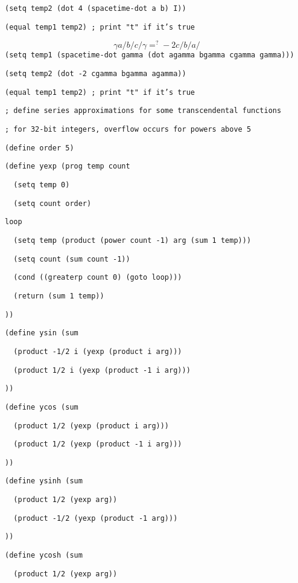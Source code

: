 {\tt (setq\ temp2\ (dot\ 4\ (spacetime-dot\ a\ b)\ I))}

{\tt (equal\ temp1\ temp2)\ ;\ print\ "t"\ if\ it's\ true}

$$\gamma a\!\!\!/b\!\!\!/c\!\!\!/\gamma\mathrel{\mathop=^?}
-2c\!\!\!/b\!\!\!/a\!\!\!/$$
{\tt (setq\ temp1\ (spacetime-dot\ gamma\ (dot\ agamma\ bgamma\ cgamma\ gamma)))}

{\tt (setq\ temp2\ (dot\ -2\ cgamma\ bgamma\ agamma))}

{\tt (equal\ temp1\ temp2)\ ;\ print\ "t"\ if\ it's\ true}

{\tt ;\ define\ series\ approximations\ for\ some\ transcendental\ functions}

{\tt ;\ for\ 32-bit\ integers,\ overflow\ occurs\ for\ powers\ above\ 5}

{\tt (define\ order\ 5)}

{\tt (define\ yexp\ (prog\ temp\ count}

{\tt \ \ (setq\ temp\ 0)}

{\tt \ \ (setq\ count\ order)}

{\tt loop}

{\tt \ \ (setq\ temp\ (product\ (power\ count\ -1)\ arg\ (sum\ 1\ temp)))}

{\tt \ \ (setq\ count\ (sum\ count\ -1))}

{\tt \ \ (cond\ ((greaterp\ count\ 0)\ (goto\ loop)))}

{\tt \ \ (return\ (sum\ 1\ temp))}

{\tt ))}

{\tt (define\ ysin\ (sum}

{\tt \ \ (product\ -1/2\ i\ (yexp\ (product\ i\ arg)))}

{\tt \ \ (product\ 1/2\ i\ (yexp\ (product\ -1\ i\ arg)))}

{\tt ))}

{\tt (define\ ycos\ (sum}

{\tt \ \ (product\ 1/2\ (yexp\ (product\ i\ arg)))}

{\tt \ \ (product\ 1/2\ (yexp\ (product\ -1\ i\ arg)))}

{\tt ))}

{\tt (define\ ysinh\ (sum}

{\tt \ \ (product\ 1/2\ (yexp\ arg))}

{\tt \ \ (product\ -1/2\ (yexp\ (product\ -1\ arg)))}

{\tt ))}

{\tt (define\ ycosh\ (sum}

{\tt \ \ (product\ 1/2\ (yexp\ arg))}

